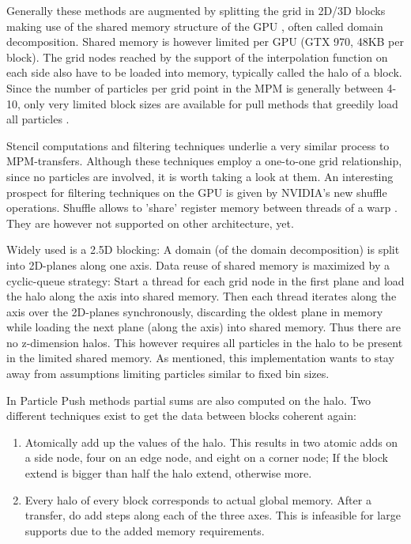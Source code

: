 \documentclass[m,times]{cgMA}
\begin{document}
Generally these methods are augmented by splitting the grid in 2D/3D blocks making use of the shared memory structure of the GPU \cite{PIC:GPU} \cite{honig2010generic} \cite{MPM:GPU}, often called domain decomposition. Shared memory is however limited per GPU (GTX 970, 48KB per block). The grid nodes reached by the support of the interpolation function on each side also have to be loaded into memory, typically called the halo of a block. Since the number of particles per grid point in the MPM is generally between 4-10, only very limited block sizes are available for pull methods that greedily load all particles \cite{MPM:SNOW}.

Stencil computations and filtering techniques underlie a very similar process to MPM-transfers. Although these techniques employ a one-to-one grid relationship, since no particles are involved, it is worth taking a look at them.
An interesting prospect for filtering techniques on the GPU is given by NVI\-DIA's new shuffle operations. Shuffle allows to 'share' register memory between threads of a warp \cite{NVIDIA:SHUFFLE}. They are however not supported on other architecture, yet.

Widely used is a 2.5D blocking: A domain (of the domain decomposition) is split into 2D-planes along one axis. Data reuse of shared memory is maximized by a cyclic-queue strategy: Start a thread for each grid node in the first plane and load the halo along the axis into shared memory. Then each thread iterates along the axis over the 2D-planes synchronously, discarding the oldest plane in memory while loading the next plane (along the axis) into shared memory. Thus there are no z-dimension halos. This however requires all particles in the halo to be present in the limited shared memory. As mentioned, this implementation wants to stay away from assumptions limiting particles similar to fixed bin sizes. \cite{brandvik2010sblock} \cite{williams2007scientific} \cite{krotkiewski2013efficient}

In Particle Push methods partial sums are also computed on the halo. Two different techniques exist to get the data between blocks coherent again:
\begin{enumerate}
\item Atomically add up the values of the halo. This results in two atomic adds on a side node, four on an edge node, and eight on a corner node; If the block extend is bigger than half the halo extend, otherwise more.
\item Every halo of every block corresponds to actual global memory. After a transfer, do add steps along each of the three axes. This is infeasible for large supports due to the added memory requirements. \cite{crassin2011interactive}
\end{enumerate}
\end{document}
